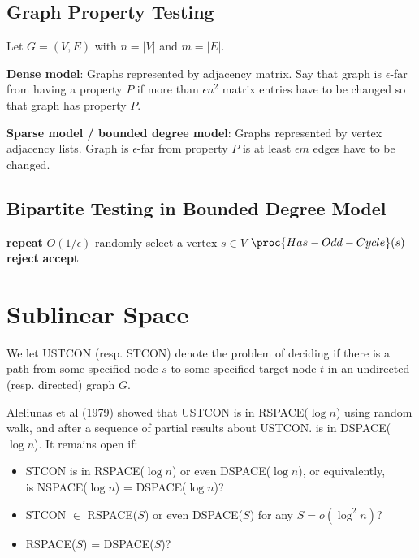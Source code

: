 \subsection{Graph Property Testing}

Let $G = (V,E)$ with $n = |V|$ and $m = |E|$.

\textbf{Dense model}: Graphs represented by adjacency matrix. Say that graph is $\epsilon$-far from having a property $P$ if more than $\epsilon n^2$ matrix entries have to be changed so that graph has property $P$.

\textbf{Sparse model / bounded degree model}: Graphs represented by vertex
adjacency lists. Graph is $\epsilon$-far from property $P$ is at least $\epsilon m$ edges have to be changed.

\subsection{Bipartite Testing in Bounded Degree Model}

\begin{codebox}
    \li \textbf{repeat} $O(1/\epsilon)$ \Do
        \li randomly select a vertex $s \in V$
        \li \If $\proc{Has-Odd-Cycle}(s)$ \Then
            \li \textbf{reject}
        \End
    \End
    \li \textbf{accept}
\end{codebox}

\section{Sublinear Space}

We let USTCON (resp. STCON) denote the problem of deciding if there is a path from some specified node $s$ to some specified target node $t$ in an undirected (resp. directed) graph $G$.

Aleliunas et al (1979) showed that USTCON is in RSPACE($\log n$) using random walk, and after a sequence of partial results about USTCON. is in DSPACE($\log n$). It remains open if:
\begin{itemize}
    \item STCON is in RSPACE($\log n$) or even DSPACE($\log n$), or equivalently, \\is NSPACE($\log n$) = DSPACE($\log n$)?
    \item STCON $\in$ RSPACE($S$) or even DSPACE($S$) for any $S = o(\log^2 n)$?
    \item RSPACE($S$) = DSPACE($S$)?
\end{itemize}

